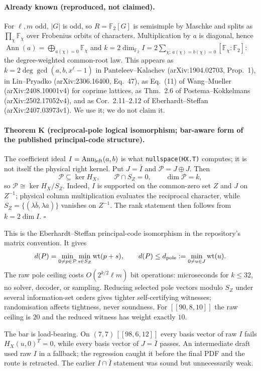 \documentclass[11pt]{article}
\theoremstyle{plain}
\theoremstyle{remark}
\begin{document}
\paragraph{Already known (reproduced, not claimed).} For $\ell,m$ odd, $|G|$ is
odd, so $R=\mathbb F_2[G]$ is semisimple by Maschke and splits as
$\prod_\chi\mathbb F_\chi$ over Frobenius orbits of characters. Multiplication by
$a$ is diagonal, hence
$\operatorname{Ann}(a)=\bigoplus_{a(\chi)=0}\mathbb F_\chi$ and
$k=2\dim_{\mathbb F_2}I
=2\sum_{\chi:\,a(\chi)=b(\chi)=0}[\mathbb F_\chi:\mathbb F_2]$: the
degree-weighted common-root law. This appears as
$k=2\deg\gcd(a,b,x^\ell-1)$ in Panteleev--Kalachev
(arXiv:1904.02703, Prop.~1), in Lin--Pryadko (arXiv:2306.16400, Eq.~47), as
Eq.~(11) of Wang--Mueller (arXiv:2408.10001v4) for coprime lattices, as
Thm.~2.6 of Postema--Kokkelmans (arXiv:2502.17052v4), and as
Cor.~2.11--2.12 of Eberhardt--Steffan (arXiv:2407.03973v1). We use it; we do
not claim it.

\paragraph{Theorem K (reciprocal-pole logical isomorphism; bar-aware form of
the published principal-code structure).}
The coefficient ideal $I=\operatorname{Ann}_{\rm left}(a,b)$ is what
\texttt{nullspace(HX.T)} computes; it is not itself the physical right kernel.
Put $J=\bar I$ and $\mathcal P=J\oplus J$. Then
\[
 \mathcal P\subseteq\ker H_X,\qquad
 \mathcal P\cap S_Z=0,\qquad \dim\mathcal P=k,
\]
so $\mathcal P\cong\ker H_X/S_Z$. Indeed, $I$ is supported on the common-zero
set $Z$ and $J$ on $Z^{-1}$; physical column multiplication evaluates the
reciprocal character, while
$S_Z=\{(\lambda\bar b,\lambda\bar a)\}$ vanishes on $Z^{-1}$. The rank statement
then follows from $k=2\dim I$. $\square$

This is the Eberhardt--Steffan principal-code isomorphism in the repository's
matrix convention. It gives
\[
 d(P)=\min_{0\ne p\in\mathcal P}\min_{s\in S_Z}\operatorname{wt}(p+s),
 \qquad
 d(P)\le d_{\rm pole}:=\min_{0\ne u\in J}\operatorname{wt}(u).
\]
The raw pole ceiling costs $O(2^{k/2}\ell m)$ bit operations: microseconds for
$k\le32$, no solver, decoder, or sampling. Reducing selected pole vectors
modulo $S_Z$ under several information-set orders gives tighter
self-certifying witnesses; randomisation affects tightness, never soundness.
For $[[90,8,10]]$ the raw ceiling is $20$ and the reduced witness has weight
exactly $10$.

The bar is load-bearing. On $(7,7)\,[[98,6,12]]$ every basis vector of raw $I$
fails $H_X(u,0)^T=0$, while every basis vector of $J=\bar I$ passes. An
intermediate draft used raw $I$ in a fallback; the regression caught it before
the final PDF and the route is retracted. The earlier $I\cap\bar I$ statement
was sound but unnecessarily weak.
\end{document}
